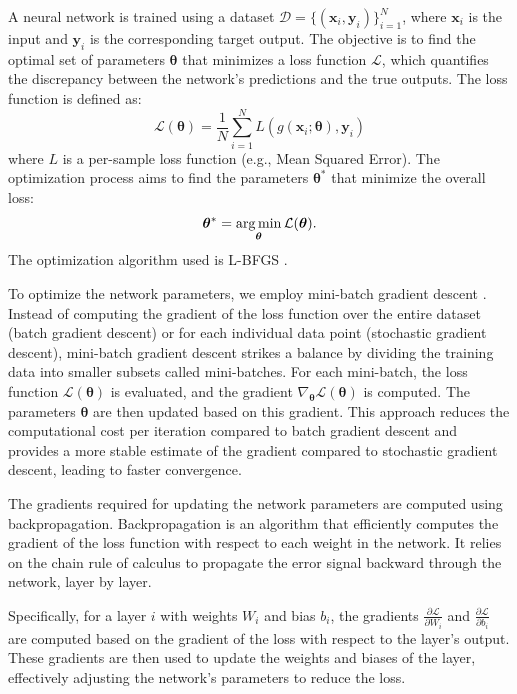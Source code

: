 A neural network is trained using a dataset \( \mathcal{D} = \{(\bm{x}_i, \bm{y}_i)\}_{i=1}^N \), where \( \bm{x}_i \) is the input and \( \bm{y}_i \) is the corresponding target output. The objective is to find the optimal set of parameters \( \bm{\theta} \) that minimizes a loss function \( \mathcal{L} \), which quantifies the discrepancy between the network's predictions and the true outputs. The loss function is defined as:
\begin{equation}
    \mathcal{L}(\bm{\theta}) = \frac{1}{N} \sum_{i=1}^N L(g(\bm{x}_i; \bm{\theta}), \bm{y}_i)
\end{equation}
where \( L \) is a per-sample loss function (e.g., Mean Squared Error). The optimization process aims to find the parameters \( \bm{\theta}^* \) that minimize the overall loss:
\begin{equation}
    \bm{\theta}^* = \operatorname*{arg\,min}_{\bm{\theta}} \mathcal{L}(\bm{\theta}).
\end{equation}
The optimization algorithm used is L-BFGS \cite{Liu_1989}.


To optimize the network parameters, we employ mini-batch gradient descent \cite{hinton2012neural}.  Instead of computing the gradient of the loss function over the entire dataset (batch gradient descent) or for each individual data point (stochastic gradient descent), mini-batch gradient descent strikes a balance by dividing the training data into smaller subsets called mini-batches. For each mini-batch, the loss function \( \mathcal{L}(\bm{\theta}) \) is evaluated, and the gradient \( \nabla_{\bm{\theta}} \mathcal{L}(\bm{\theta}) \) is computed. The parameters \( \bm{\theta} \) are then updated based on this gradient. This approach reduces the computational cost per iteration compared to batch gradient descent and provides a more stable estimate of the gradient compared to stochastic gradient descent, leading to faster convergence.



The gradients required for updating the network parameters are computed using backpropagation. Backpropagation is an algorithm that efficiently computes the gradient of the loss function with respect to each weight in the network. It relies on the chain rule of calculus to propagate the error signal backward through the network, layer by layer.

Specifically, for a layer \( i \) with weights \( W_i \) and bias \( b_i \), the gradients \( \frac{\partial \mathcal{L}}{\partial W_i} \) and \( \frac{\partial \mathcal{L}}{\partial b_i} \) are computed based on the gradient of the loss with respect to the layer's output. These gradients are then used to update the weights and biases of the layer, effectively adjusting the network's parameters to reduce the loss.

